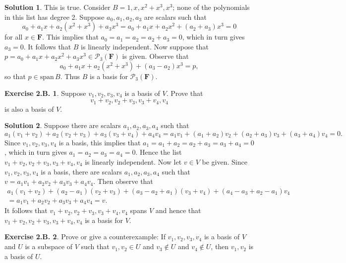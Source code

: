 \documentclass[12pt]{article}
\theoremstyle{definition}
\theoremstyle{exercise}
\newtheorem{exercise}{Exercise 2.B.}
\theoremstyle{solution}
\newtheorem*{solution}{Solution}
\newcommand{\Span}{\text{span}}
\newcommand{\F}{\mathbf{F}}
\begin{document}
\begin{solution}
    This is true. Consider \( B = 1, x, x^2 + x^3, x^3 \); none of the polynomials in this list has degree 2. Suppose \( a_0, a_1, a_2, a_3 \) are scalars such that
    \[
        a_0 + a_1 x + a_2 (x^2 + x^3) + a_3 x^3 = a_0 + a_1 x + a_2 x^2 + (a_2 + a_3) x^3 = 0
    \]
    for all \( x \in \F \). This implies that \( a_0 = a_1 = a_2 = a_2 + a_3 = 0 \), which in turn gives \( a_3 = 0 \). It follows that \( B \) is linearly independent. Now suppose that \( p = a_0 + a_1 x + a_2 x^2 + a_3 x^3 \in \mathcal{P}_3 (\F) \) is given. Observe that
    \[
        a_0 + a_1 x + a_2 (x^2 + x^3) + (a_3 - a_2) x^3 = p,
    \]
    so that \( p \in \Span\,B \). Thus \( B \) is a basis for \( \mathcal{P}_3 (\F) \).
\end{solution}

\begin{exercise}
\label{ex:6}
    Suppose \( v_1, v_2, v_3, v_4 \) is a basis of \( V \). Prove that
    \[
        v_1 + v_2, v_2 + v_3, v_3 + v_4, v_4
    \]
    is also a basis of \( V \).
\end{exercise}

\begin{solution}
    Suppose there are scalars \( a_1, a_2, a_3, a_4 \) such that
    \[
        a_1 (v_1 + v_2) + a_2 (v_2 + v_3) + a_3 (v_3 + v_4) + a_4 v_4 = a_1 v_1 + (a_1 + a_2) v_2 + (a_2 + a_3) v_3 + (a_3 + a_4) v_4 = 0.
    \]
    Since \( v_1, v_2, v_3, v_4 \) is a basis, this implies that \( a_1 = a_1 + a_2 = a_2 + a_3 = a_3 + a_4 = 0 \), which in turn gives \( a_1 = a_2 = a_3 = a_4 = 0 \). Hence the list \( v_1 + v_2, v_2 + v_3, v_3 + v_4, v_4 \) is linearly independent. Now let \( v \in V \) be given. Since \( v_1, v_2, v_3, v_4 \) is a basis, there are scalars \( a_1, a_2, a_3, a_4 \) such that \( v = a_1 v_1 + a_2 v_2 + a_3 v_3 + a_4 v_4 \). Then observe that
    \begin{multline*}
        a_1 (v_1 + v_2) + (a_2 - a_1)(v_2 + v_3) + (a_3 - a_2 + a_1)(v_3 + v_4) + (a_4 - a_3 + a_2 - a_1)v_4 \\
        = a_1 v_1 + a_2 v_2 + a_3 v_3 + a_4 v_4 = v.
    \end{multline*}
    It follows that \( v_1 + v_2, v_2 + v_3, v_3 + v_4, v_4 \) spans \( V \) and hence that \( v_1 + v_2, v_2 + v_3, v_3 + v_4, v_4 \) is a basis for \( V \).
\end{solution}

\begin{exercise}
\label{ex:7}
    Prove or give a counterexample: If \( v_1, v_2, v_3, v_4 \) is a basis of \( V \) and \( U \) is a subspace of \( V \) such that \( v_1, v_2 \in U \) and \( v_3 \not\in U \) and \( v_4 \not\in U \), then \( v_1, v_2 \) is a basis of \( U \).
\end{exercise}
\end{document}
